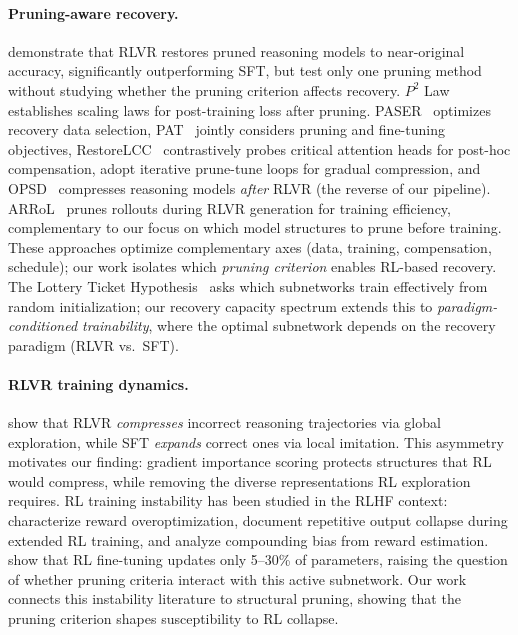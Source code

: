 \paragraph{Pruning-aware recovery.}
\citet{selfhealing2025} demonstrate that RLVR restores pruned reasoning models to near-original accuracy, significantly outperforming SFT, but test only one pruning method without studying whether the pruning criterion affects recovery.
$P^2$ Law~\citep{p2law2025} establishes scaling laws for post-training loss after pruning.
PASER~\citep{paser2025} optimizes recovery data selection, PAT~\citep{pat2025} jointly considers pruning and fine-tuning objectives, RestoreLCC~\citep{restorelcc_2025} contrastively probes critical attention heads for post-hoc compensation, \citet{boiling_frog_2026} adopt iterative prune-tune loops for gradual compression, and OPSD~\citep{opsd2026} compresses reasoning models \emph{after} RLVR (the reverse of our pipeline).
ARRoL~\citep{xu2026arrol} prunes rollouts during RLVR generation for training efficiency, complementary to our focus on which model structures to prune before training.
These approaches optimize complementary axes (data, training, compensation, schedule); our work isolates which \emph{pruning criterion} enables RL-based recovery.
The Lottery Ticket Hypothesis~\citep{frankle2019lth} asks which subnetworks train effectively from random initialization; our recovery capacity spectrum extends this to \emph{paradigm-conditioned trainability}, where the optimal subnetwork depends on the recovery paradigm (RLVR vs.\ SFT).

\paragraph{RLVR training dynamics.}
\citet{rlsqueezes2026} show that RLVR \emph{compresses} incorrect reasoning trajectories via global exploration, while SFT \emph{expands} correct ones via local imitation.
This asymmetry motivates our finding: gradient importance scoring protects structures that RL would compress, while removing the diverse representations RL exploration requires.
RL training instability has been studied in the RLHF context: \citet{gao2023overoptimization} characterize reward overoptimization, \citet{dong2025rlplus} document repetitive output collapse during extended RL training, and \citet{shah2025comedy} analyze compounding bias from reward estimation.
\citet{mukherjee2025rlsubnetworks} show that RL fine-tuning updates only 5--30\% of parameters, raising the question of whether pruning criteria interact with this active subnetwork.
Our work connects this instability literature to structural pruning, showing that the pruning criterion shapes susceptibility to RL collapse.
